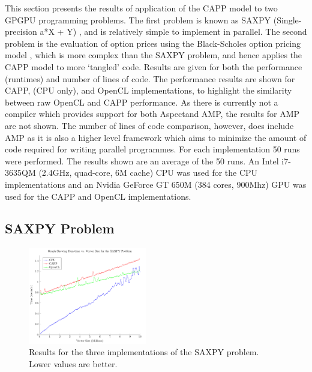 \documentclass{sig-alternate-05-2015}
\begin{document}
This section presents the results of application of the \mbox{CAPP} model to two
GPGPU programming problems. The first problem is known as SAXPY
(Single-precision a*X + Y) \cite{harris:saxpy}, and is relatively 
simple to implement in parallel. The second problem is the evaluation of option 
prices using the Black-Scholes option pricing model \cite{gems:blackscholes},
which is more complex than the SAXPY problem, and hence applies the CAPP model 
to more `tangled' \CPP code. Results are given for both the performance (runtimes) and
number of lines of code. The performance results are shown for CAPP, \CPP (CPU only), and OpenCL
implementations, to highlight the similarity between raw OpenCL and CAPP performance. As there is currently
not a compiler which provides support for both Aspect\CPP and \CPP AMP, the results for \CPP AMP are not shown. 
The number of lines of code comparison, however, does include \CPP AMP as it is also a higher level framework
which aims to minimize the amount of code required for writing parallel programmes.
For each implementation 50 runs were performed. The results shown are an average of the 50 runs. An Intel 
i7-3635QM (2.4GHz, quad-core, 6M cache) CPU was used for the CPU
implementations and an Nvidia GeForce GT 650M (384 cores, 900Mhz) GPU was used for
the CAPP and OpenCL implementations.

\subsection{SAXPY Problem}


\begin{figure}[!t]
	\centering
	\includegraphics[width=0.46\textwidth]{Saxpy}
	\caption{Results for the three implementations of the SAXPY problem. Lower
	values are better.}
	\label{fig:saxpy}
\end{figure}
\end{document}
